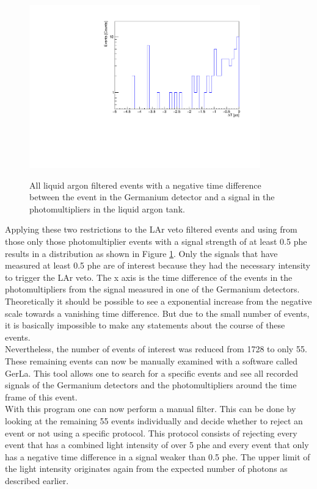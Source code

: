 \documentclass[encoding=utf8,british]{tumphthesis}
\begin{document}
\begin{figure}[t!]
	\centering
	\ifmakefigures%
	\includegraphics[width=100mm]{./Bilder/TriggerTimeOnly4.pdf}
	\fi%
	\label{fig:Trigger4}
	\caption{
		All liquid argon filtered events with a negative time difference between the event in the Germanium detector and a signal in the photomultipliers in the liquid argon tank.
	}
\end{figure}
Applying these two restrictions to the LAr veto filtered events and using from those only those photomultiplier events with a signal strength of at least 0.5 phe results in a distribution as shown in Figure \ref{fig:Trigger4}.
Only the signals that have measured at least 0.5 phe are of interest because they had the necessary intensity to trigger the LAr veto. 
The x axis is the time difference of the events in the photomultipliers from the signal measured in one of the Germanium detectors.
Theoretically it should be possible to see a exponential increase from the negative scale towards a vanishing time difference.
But due to the small number of events, it is basically impossible to make any statements about the course of these events.
\\

Nevertheless, the number of events of interest was reduced from 1728 to only 55.  
These remaining events can now be manually examined with a software called GerLa.
This tool allows one to search for a specific events and see all recorded signals of the Germanium detectors and the photomultipliers around the time frame of this event.
\\

With this program one can now perform a manual filter.
This can be done by looking at the remaining 55 events individually and decide whether to reject an event or not using a specific protocol.
This protocol consists of rejecting every event that has a combined light intensity of over 5 phe and every event that only has a negative time difference in a signal weaker than 0.5 phe.
The upper limit of the light intensity originates again from the expected number of photons as described earlier.
\\
\end{document}
